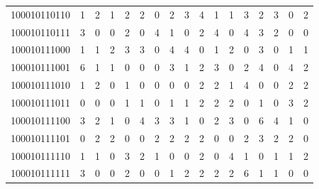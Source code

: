 \documentclass[10pt,a4paper]{article}
\begin{document}
\begin{longtable}{ |c|c|c|c|c|c|c|c|c|c|c|c|c|c|c|c|c| }
    100010110110              & 1                            & 2                                & 1                            & 2                              & 2   & 0   & 2   & 3   & 4   & 1   & 1   & 3   & 2   & 3   & 0   & 2   \\
    100010110111              & 3                            & 0                                & 0                            & 2                              & 0   & 4   & 1   & 0   & 2   & 4   & 0   & 4   & 3   & 2   & 0   & 0   \\
    100010111000              & 1                            & 1                                & 2                            & 3                              & 3   & 0   & 4   & 4   & 0   & 1   & 2   & 0   & 3   & 0   & 1   & 1   \\
    100010111001              & 6                            & 1                                & 1                            & 0                              & 0   & 0   & 3   & 1   & 2   & 3   & 0   & 2   & 4   & 0   & 4   & 2   \\
    100010111010              & 1                            & 2                                & 0                            & 1                              & 0   & 0   & 0   & 0   & 2   & 2   & 1   & 4   & 0   & 0   & 2   & 2   \\
    100010111011              & 0                            & 0                                & 0                            & 1                              & 1   & 0   & 1   & 1   & 2   & 2   & 2   & 0   & 1   & 0   & 3   & 2   \\
    100010111100              & 3                            & 2                                & 1                            & 0                              & 4   & 3   & 3   & 1   & 0   & 2   & 3   & 0   & 6   & 4   & 1   & 0   \\
    100010111101              & 0                            & 2                                & 2                            & 0                              & 0   & 2   & 2   & 2   & 2   & 0   & 0   & 2   & 3   & 2   & 2   & 0   \\
    100010111110              & 1                            & 1                                & 0                            & 3                              & 2   & 1   & 0   & 0   & 2   & 0   & 4   & 1   & 0   & 1   & 1   & 2   \\
    100010111111              & 3                            & 0                                & 0                            & 2                              & 0   & 0   & 1   & 2   & 2   & 2   & 2   & 6   & 1   & 1   & 0   & 0   \\

\end{longtable}
\end{document}
